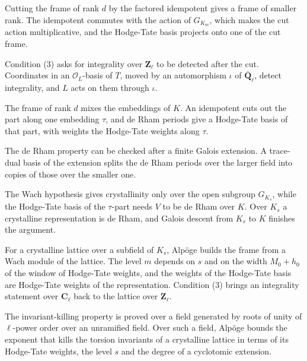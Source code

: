 Cutting the frame of rank $d$ by the factored idempotent gives a frame of
smaller rank. The idempotent commutes with the action of $G_{K_m}$, which makes
the cut action multiplicative, and the Hodge-Tate basis projects onto one of
the cut frame.

Condition (3) asks for integrality over $\mathbf Z_\ell$ to be detected after
the cut. Coordinates in an $\mathcal O_L$-basis of $T$, moved by an
automorphism $\iota$ of $\bar{\mathbf Q}_\ell$, detect integrality, and $L$
acts on them through $\iota$.

The frame of rank $d$ mixes the embeddings of $K$. An idempotent cuts out the
part along one embedding $\tau$, and de Rham periods give a Hodge-Tate basis of
that part, with weights the Hodge-Tate weights along $\tau$.

The de Rham property can be checked after a finite Galois extension. A
trace-dual basis of the extension splits the de Rham periods over the larger
field into copies of those over the smaller one.

The Wach hypothesis gives crystallinity only over the open subgroup $G_{K_s}$,
while the Hodge-Tate basis of the $\tau$-part needs $V$ to be de Rham over $K$.
Over $K_s$ a crystalline representation is de Rham, and Galois descent from
$K_s$ to $K$ finishes the argument.

For a crystalline lattice over a subfield of $K_s$, Alpöge builds the frame
from a Wach module of the lattice. The level $m$ depends on $s$ and on the
width $M_0+h_0$ of the window of Hodge-Tate weights, and the weights of the
Hodge-Tate basis are Hodge-Tate weights of the representation. Condition (3)
brings an integrality statement over $\mathbf C_\ell$ back to the lattice over
$\mathbf Z_\ell$.

The invariant-killing property is proved over a field generated by roots of
unity of $\ell$-power order over an unramified field. Over such a field,
Alpöge bounds the exponent that kills the torsion invariants of a crystalline
lattice in terms of its Hodge-Tate weights, the level $s$ and the degree of a
cyclotomic extension.

